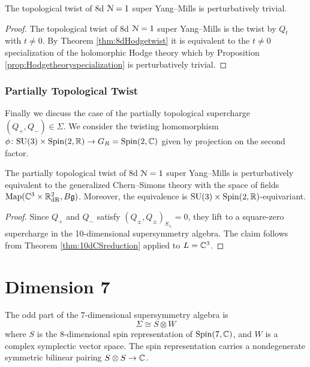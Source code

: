 \documentclass[10pt, oneside]{article}
\begin{document}
\begin{corollary}
The topological twist of 8d $\mathcal N=1$ super Yang--Mills is perturbatively trivial.
\label{cor:8dtopologicaltwist}
\end{corollary}
\begin{proof}
The topological twist of 8d $\mathcal N=1$ super Yang--Mills is the twist by $Q_t$ with $t\neq 0$. By Theorem \ref{thm:8dHodgetwist} it is equivalent to the $t\neq 0$ specialization of the holomorphic Hodge theory which by Proposition \ref{prop:Hodgetheoryspecialization} is perturbatively trivial.
\end{proof}

\subsubsection{Partially Topological Twist}
\label{sect:8dpartiallytopologicaltwist}

Finally we discuss the case of the partially topological supercharge $(Q_+, Q_-)\in\Sigma$. We consider the twisting homomorphism $\phi\colon \mathrm{SU}(3)\times \mathrm{Spin}(2, \mathbb R)\rightarrow G_R=\mathrm{Spin}(2, \mathbb C)$ given by projection on the second factor.

\begin{theorem}
The partially topological twist of 8d $\mathcal N=1$ super Yang--Mills is perturbatively equivalent to the generalized Chern--Simons theory with the space of fields $\operatorname{Map}(\mathbb C^3\times \mathbb R^2_{\mathrm{dR}}, B\mathfrak g)$. Moreover, the equivalence is $\mathrm{SU}(3)\times \mathrm{Spin}(2, \mathbb R)$-equivariant.
\label{thm:8dpartiallytopologicaltwist}
\end{theorem}
\begin{proof}
Since $Q_+$ and $Q_-$ satisfy $(Q_\pm, Q_\pm)_{S_\pm} = 0$, they lift to a square-zero supercharge in the 10-dimensional supersymmetry algebra. The claim follows from Theorem \ref{thm:10dCSreduction} applied to $L=\mathbb C^3$.
\end{proof}

\section{Dimension 7} \label{7d_section}

The odd part of the $7$-dimensional supersymmetry algebra is
\[
\Sigma\cong S\otimes W
\]
where $S$ is the 8-dimensional spin representation of $\mathrm{Spin}(7, \mathbb C)$, and $W$ is a complex symplectic vector space.  The spin representation carries a nondegenerate symmetric bilinear pairing $S\otimes S\rightarrow \mathbb C$. 
\end{document}
